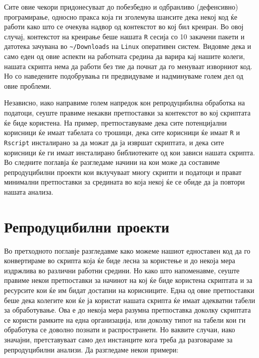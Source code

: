 \documentclass[
]{book}
\begin{document}
Сите овие чекори придонесуваат до побезбедно и одбранливо (дефенсивно) програмирање, односно пракса која ги зголемува шансите дека некој код ќе работи како што се очекува надвор од контекстот во кој бил креиран. Во овој случај, контекстот на креирање беше нашата \texttt{R} сесија со 10 закачени пакети и датотека зачувана во \texttt{\textasciitilde{}/Downloads} на \texttt{Linux} оперативен систем. Видовме дека и само еден од овие аспекти на работната средина да варира кај нашите колеги, нашата скрипта нема да работи без тие да почнат да го менуваат изворниот код. Но со наведените подобрувања ги предвидуваме и надминуваме голем дел од овие проблеми.

Независно, иако направиме голем напредок кон репродуцибилна обработка на податоци, сеуште правиме некакви претпоставки за контекстот во кој скриптата ќе биде користена. На пример, претпоставуваме дека сите потенцијални корисници ќе имаат табелата со трошици, дека сите корисници ќе имаат \texttt{R} и \texttt{Rscript} инсталирано за да можат да ја извршат скриптата, и дека сите корисници ќе ги имаат инсталирано библиотеките од кои зависи нашата скрипта. Во следните поглавја ќе разгледаме начини на кои може да составиме репродуцибилни проекти кои вклучуваат многу скрипти и податоци и прават минимални претпоставки за средината во која некој ќе се обиде да ја повтори нашата анализа.

\hypertarget{ux440ux435ux43fux440ux43eux434ux443ux446ux438ux431ux438ux43bux43dux438-ux43fux440ux43eux435ux43aux442ux438}{%
\chapter{Репродуцибилни проекти}\label{ux440ux435ux43fux440ux43eux434ux443ux446ux438ux431ux438ux43bux43dux438-ux43fux440ux43eux435ux43aux442ux438}}

Во претходното поглавје разгледавме како можеме нашиот едноставен код да го конвертираме во скрипта која ќе биде лесна за користење и до некоја мера издржлива во различни работни средини. Но како што напоменавме, сеуште правиме некои претпоставки за начинот на кој ќе биде користена скриптата и за ресурсите кои ќе им бидат достапни на корисниците. Една од овие претпоставки беше дека колегите кои ќе ја користат нашата скрипта ќе имаат адекватни табели за обработување. Ова е до некоја мера разумна претпоставка доколку скриптата се користи рамките на една организација, или доколку типот на табели кои ги обработува се доволно познати и распространети. Но ваквите случаи, иако значајни, претставуваат само дел инстанците кога треба да разговараме за репродуцибилни анализи. Да разгледаме некои примери:
\end{document}

